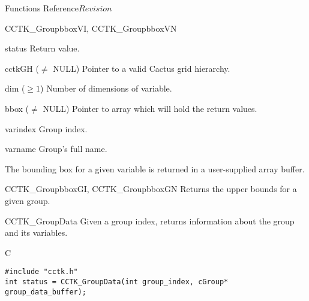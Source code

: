 \begin{cactuspart}{ Functions Reference}{}{$Revision$}
\begin{FunctionDescription}{CCTK\_GroupbboxVI, CCTK\_GroupbboxVN}
\begin{ParameterSection}
\begin{Parameter}{status} Return value. \end{Parameter}
\begin{Parameter}{cctkGH ($\ne$ NULL)} Pointer to a valid Cactus grid hierarchy. \end{Parameter}
\begin{Parameter}{dim ($\ge 1$)} Number of dimensions of variable. \end{Parameter}
\begin{Parameter}{bbox ($\ne$ NULL)} Pointer to array which will hold the return values. \end{Parameter}
\begin{Parameter}{varindex} Group index. \end{Parameter}
\begin{Parameter}{varname} Group's full name. \end{Parameter}
\end{ParameterSection}

\begin{Discussion}
The bounding box for a given variable is returned in a user-supplied array buffer.
\end{Discussion}

\begin{SeeAlsoSection}
\begin{SeeAlso}{CCTK\_GroupbboxGI, CCTK\_GroupbboxGN}
Returns the upper bounds for a given group.
\end{SeeAlso}
\end{SeeAlsoSection}
\end{FunctionDescription}


\begin{FunctionDescription}{CCTK\_GroupData}
\label{CCTK-GroupData}
Given a group index, returns information about the group and its variables.

\begin{SynopsisSection}
\begin{Synopsis}{C}
\begin{verbatim}
#include "cctk.h"
int status = CCTK_GroupData(int group_index, cGroup* group_data_buffer);
\end{verbatim}
\end{Synopsis}
\end{SynopsisSection}


\end{FunctionDescription}
\end{cactuspart}
